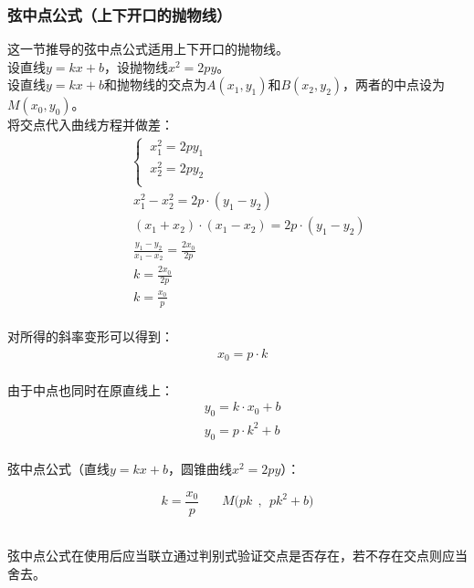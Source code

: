 \documentclass[UTF8]{ctexart}
\begin{document}
\subsubsection{弦中点公式（上下开口的抛物线）}
    \setcounter{equation}{0}
    这一节推导的弦中点公式适用上下开口的抛物线。\\[3mm]
    设直线$y=kx+b$，设抛物线$x^2=2py$。\\[3mm]
    设直线$y=kx+b$和抛物线的交点为$A(x_1,y_1)$和$B(x_2,y_2)$，两者的中点设为$M(x_0,y_0)$。\\[6mm]
    将交点代入曲线方程并做差：\vspace{5pt}
    \begin{align}
        &~~~~\begin{cases}
            ~x_1^2=2py_1\\[1mm]
            ~x_2^2=2py_2\\[1mm]
        \end{cases}\\[3mm]
        &~~~~~x_1^2-x_2^2=2p\cdot(y_1-y_2)\\[3mm]
        &~~~~~(x_1+x_2)\cdot(x_1-x_2)=2p\cdot(y_1-y_2)\\[3mm]
        &~~~~~\frac{y_1-y_2}{x_1-x_2}=\frac{2x_0}{2p}\\[3mm]
        &~~~~~k=\frac{2x_0}{2p}\\[3mm]
        &~~~~~k=\frac{x_0}{p}
    \end{align}\\
    对所得的斜率变形可以得到：
    \begin{align}
        &x_0=p\cdot k
    \end{align}\\
    由于中点也同时在原直线上：
    \begin{align}
        &y_0=k\cdot x_0+b\\[3mm]
        &y_0=p\cdot k^2+b
    \end{align}\\
    弦中点公式（直线$y=kx+b$，圆锥曲线$x^2=2py$）：\vspace{3pt}
    \begin{large}
        \begin{equation*}
            k=\frac{x_0}{p}~~~~~~~~M\big(pk~~,~~pk^2+b\big)
        \end{equation*}
    \end{large}\\
    弦中点公式在使用后应当联立通过判别式验证交点是否存在，若不存在交点则应当舍去。

\newpage
\end{document}
